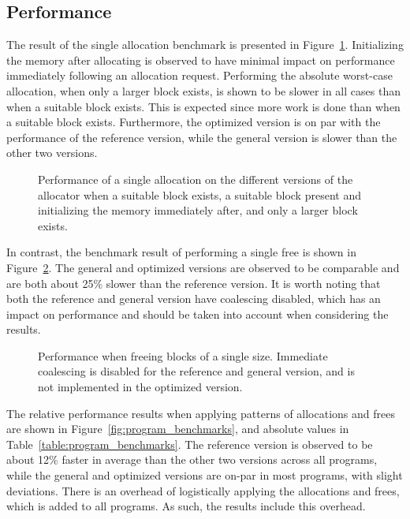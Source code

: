 
\subsection{Performance}
\label{sec:results:performance}

The result of the single allocation benchmark is presented in Figure~\ref{fig:allocation_performance}. Initializing the memory after allocating is observed to have minimal impact on performance immediately following an allocation request. Performing the absolute worst-case allocation, when only a larger block exists, is shown to be slower in all cases than when a suitable block exists. This is expected since more work is done than when a suitable block exists. Furthermore, the optimized version is on par with the performance of the reference version, while the general version is slower than the other two versions. 

\begin{figure}[H]
    \centering
    
    \caption{Performance of a single allocation on the different versions of the allocator when a suitable block exists, a suitable block present and initializing the memory immediately after, and only a larger block exists.}
    \label{fig:allocation_performance}
\end{figure}

In contrast, the benchmark result of performing a single free is shown in Figure~\ref{fig:free_performance}. The general and optimized versions are observed to be comparable and are both about 25\% slower than the reference version. It is worth noting that both the reference and general version have coalescing disabled, which has an impact on performance and should be taken into account when considering the results.

\begin{figure}[H]
    \centering
    
    \caption{Performance when freeing blocks of a single size. Immediate coalescing is disabled for the reference and general version, and is not implemented in the optimized version.}
    \label{fig:free_performance}
\end{figure}

The relative performance results when applying patterns of allocations and frees are shown in Figure~\ref{fig:program_benchmarks}, and absolute values in Table~\ref{table:program_benchmarks}. The reference version is observed to be about 12\% faster in average than the other two versions across all programs, while the general and optimized versions are on-par in most programs, with slight deviations. There is an overhead of logistically applying the allocations and frees, which is added to all programs. As such, the results include this overhead. 

